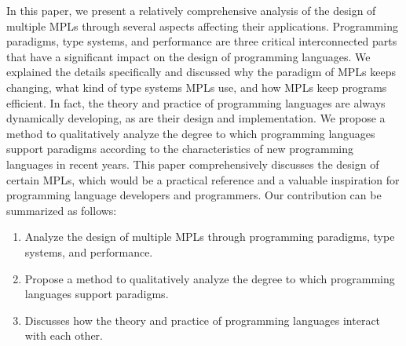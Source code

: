 In this paper, we present a relatively comprehensive analysis of the design of multiple MPLs through
several aspects affecting their applications.
Programming paradigms, type systems, and performance
are three critical interconnected parts that have a significant
impact on the design of programming languages.
We explained the details specifically and discussed why the paradigm of
MPLs keeps changing, what kind of type systems MPLs use, and how MPLs keep programs efficient.
In fact, the theory and practice of programming languages are always dynamically
developing, as are their design and implementation.
We propose a method to qualitatively analyze the degree to which programming languages support paradigms
according to the characteristics of new programming languages in recent years.
This paper comprehensively discusses the design of certain MPLs, which
would be a practical reference and a valuable inspiration for
programming language developers and programmers.
Our contribution can be summarized as follows:
\begin{enumerate}
\item Analyze the design of multiple MPLs through programming paradigms, type systems, and performance.
\item Propose a method to qualitatively analyze the degree to which programming languages support paradigms.
\item Discusses how the theory and practice of programming languages interact with each other.
\end{enumerate}

%

